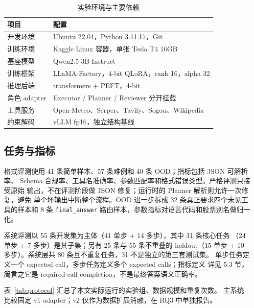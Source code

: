 \documentclass[UTF8,a4paper,12pt]{ctexart}
\begin{document}
\begin{table}[H]
  \centering
  \small
  \caption{实验环境与主要依赖}
  \label{tab:env}
  \begin{tabular}{ll}
    \toprule
    项目 & 配置 \\
    \midrule
    开发环境 & Ubuntu 22.04，Python 3.11.17，Git \\
    训练环境 & Kaggle Linux 容器，单张 Tesla T4 16GB \\
    基座模型 & Qwen2.5-3B-Instruct \\
    训练框架 & LLaMA-Factory，4-bit QLoRA，rank 16，alpha 32 \\
    推理后端 & transformers + PEFT，4-bit \\
    角色 adapter & Executor / Planner / Reviewer 分开挂载 \\
    工具服务 & Open-Meteo、Serper、Tavily、Sogou、Wikipedia \\
    约束解码 & vLLM fp16，独立结构基线 \\
    \bottomrule
  \end{tabular}
\end{table}

\subsection{任务与指标}
格式评测使用 41 条简单样本、57 条难例和 40 条 OOD；指标包括 JSON 可解析率、
Schema 合规率、工具名准确率、参数匹配率和格式错误类型。严格评测只接受原始
输出，不在评测阶段做 JSON 修复；运行时的 Planner 解析则允许一次修复，避免
单个坏输出中断整个流程。OOD 进一步拆成 32 条真正要求四个未见工具的样本和
8 条 \texttt{final\_answer} 路由样本，参数指标对语言代码和股票别名做归一化。

系统评测以 55 条开发集为主体（41 单步 + 14 多步），其中 31 条核心任务
（24 单步 + 7 多步）是其子集；另有 25 条与 55 条不重叠的 holdout（15 单步
+ 10 多步）。系统层共 80 条互不重复任务，31 不是独立的第三套测试集。
单步任务定义一个 expected call，多步任务定义多个 expected calls；指标定义
详见 5.3 节，简言之它是 required-call completion，不是最终答案语义正确率。

表~\ref{tab:protocol} 汇总了本文实际运行的实验组、数据规模和重复次数。
主系统比较固定 v1 adapter；v2 仅作为数据扩展消融，在 RQ3 中单独报告。
\end{document}
